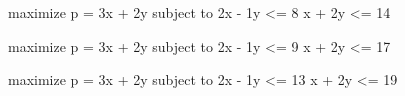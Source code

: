 maximize p = 3x + 2y subject to
2x - 1y <= 8
x + 2y <= 14





maximize p = 3x + 2y subject to
2x - 1y <= 9
x + 2y <= 17



maximize p = 3x + 2y subject to
2x - 1y <= 13
x + 2y <= 19

